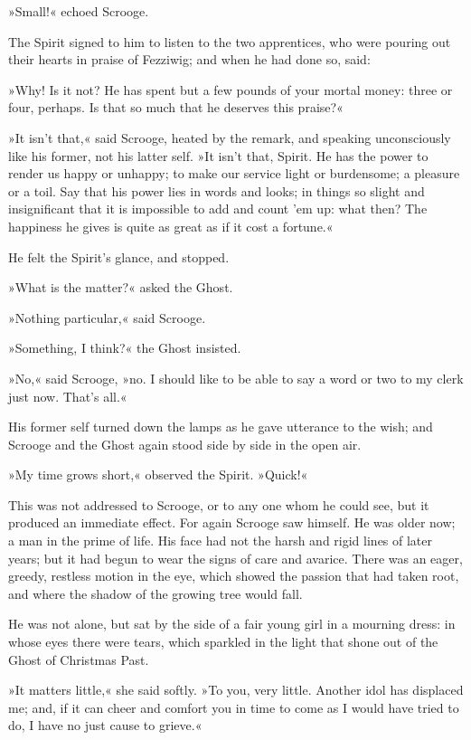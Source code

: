 »Small!« echoed Scrooge.

The Spirit signed to him to listen to the two apprentices, who were pouring out their hearts in praise of Fezziwig; and when he had done so, said:

»Why! Is it not? He has spent but a few pounds of your mortal money: three or four, perhaps. Is that so much that he deserves this praise?«

»It isn't that,« said Scrooge, heated by the remark, and speaking unconsciously like his former, not his latter self. »It isn't that, Spirit. He has the power to render us happy or unhappy; to make our service light or burdensome; a pleasure or a toil. Say that his power lies in words and looks; in things so slight and insignificant that it is impossible to add and count 'em up: what then? The happiness he gives is quite as great as if it cost a fortune.«

He felt the Spirit's glance, and stopped.

»What is the matter?« asked the Ghost.

»Nothing particular,« said Scrooge.

»Something, I think?« the Ghost insisted.

»No,« said Scrooge, »no. I should like to be able to say a word or two to my clerk just now. That's all.«

His former self turned down the lamps as he gave utterance to the wish; and Scrooge and the Ghost again stood side by side in the open air.

»My time grows short,« observed the Spirit. »Quick!«

This was not addressed to Scrooge, or to any one whom he could see, but it produced an immediate effect. For again Scrooge saw himself. He was older now; a man in the prime of life. His face had not the harsh and rigid lines of later years; but it had begun to wear the signs of care and avarice. There was an eager, greedy, restless motion in the eye, which showed the passion that had taken root, and where the shadow of the growing tree would fall.

He was not alone, but sat by the side of a fair young girl in a mourning dress: in whose eyes there were tears, which sparkled in the light that shone out of the Ghost of Christmas Past.

»It matters little,« she said softly. »To you, very little. Another idol has displaced me; and, if it can cheer and comfort you in time to come as I would have tried to do, I have no just cause to grieve.«

